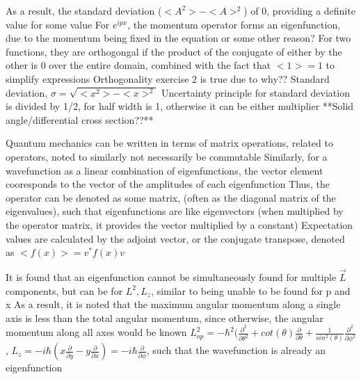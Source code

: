 \documentclass[11 pt, twoside]{article}
\newenvironment{outline*}
{
	\begin{outline}[enumerate]
	}
	{\end{outline}
}
\begin{document}
\begin{outline*}
	\2 As a result, the standard deviation ($<A^2> - <A>^2$) of 0, providing a definite value for some value
	\2 For $e^{ipx}$, the momentum operator forms an eigenfunction, due to the momentum being fixed in the equation or some other reason?
\1 For two functions, they are orthogongal if the product of the conjugate of either by the other is 0 over the entire domain, combined with the fact that $<1> = 1$ to simplify expressions
	\2 Orthogonality exercise 2 is true due to why??
\1 Standard deviation, $\sigma = \sqrt{<x^2> - <x>^2}$
\1 Uncertainty principle for standard deviation is divided by 1/2, for half width is 1, otherwise it can be either multiplier
\1 **Solid angle/differential cross section??**

\1 Quantum mechanics can be written in terms of matrix operations, related to operators, noted to similarly not necessarily be commutable
	\2 Similarly, for a wavefunction as a linear combination of eigenfunctions, the vector element cooresponds to the vector of the amplitudes of each eigenfunction
	\2 Thus, the operator can be denoted as some matrix, (often as the diagonal matrix of the eigenvalues), such that eigenfunctions are like eigenvectors (when multiplied by the operator matrix, it provides the vector multiplied by a constant)
	\2 Expectation values are calculated by the adjoint vector, or the conjugate transpose, denoted as $<f(x)> = v^*f(x)v$

\1 It is found that an eigenfunction cannot be simultaneously found for multiple $\vec{L}$ components, but can be for $L^2, L_z$, similar to being unable to be found for p and x
	\2 As a result, it is noted that the maximum angular momentum along a single axis is less than the total angular momentum, since otherwise, the angular momentum along all axes would be known
	\2 $L^2_{op} = -\hbar^2(\frac{\partial^2}{\partial \theta^2} + cot(\theta)\frac{\partial}{\partial \theta} + \frac{1}{sin^2(\theta)}\frac{\partial^2}{\partial \phi^2}$, $L_z = -i\hbar(x\frac{\partial}{\partial y} - y\frac{\partial}{\partial x}) = -i\hbar\frac{\partial}{\partial \phi}$, such that the wavefunction is already an eigenfunction


\end{outline*}
\end{document}
